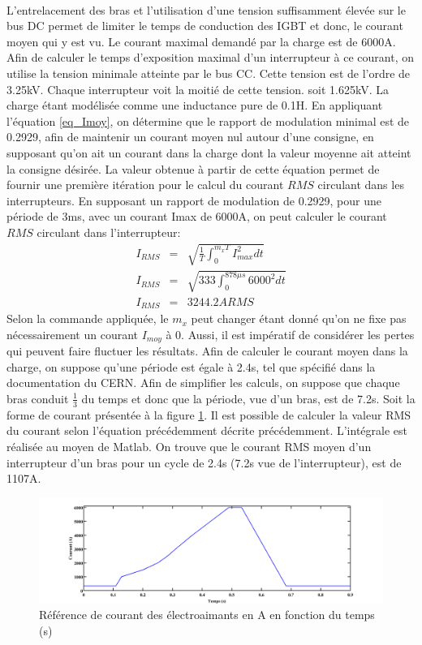 \paragraph{}L'entrelacement des bras et l'utilisation d'une tension suffisamment élevée sur le bus DC permet de limiter le temps de conduction des IGBT et donc, le courant moyen qui y est vu. Le courant maximal demandé par la charge est de 6000A. Afin de calculer le temps d'exposition maximal d'un interrupteur à ce courant, on utilise la tension minimale atteinte par le bus CC. Cette tension est de l'ordre de 3.25kV. Chaque interrupteur voit la moitié de cette tension. soit 1.625kV. La charge étant modélisée comme une inductance pure de 0.1H. En appliquant l'équation \ref{eq_Imoy}, on détermine que le rapport de modulation minimal est de 0.2929, afin de maintenir un courant moyen nul autour d'une consigne, en supposant qu'on ait un courant dans la charge dont la valeur moyenne ait atteint la consigne désirée. La valeur obtenue à partir de cette équation permet de fournir une première itération pour le calcul du courant $RMS$ circulant dans les interrupteurs. En supposant un rapport de modulation de 0.2929, pour une période de 3ms, avec un courant Imax de 6000A, on peut calculer le courant $RMS$ circulant dans l'interrupteur:
\begin{eqnarray}
I_{RMS} &=& \sqrt{\frac{1}{T}\int_0^{m_xT}I_{max}^2 dt}\\
I_{RMS} &=& \sqrt{333\int_0^{878\mu s}6000^2 dt}\\
I_{RMS} &=& 3244.2A RMS
\end{eqnarray}
Selon la commande appliquée, le $m_x$ peut changer étant donné qu'on ne fixe pas nécessairement un courant $I_{moy}$ à 0. Aussi, il est impératif de considérer les pertes qui peuvent faire fluctuer les résultats. Afin de calculer le courant moyen dans la charge, on suppose qu'une période est égale à 2.4s, tel que spécifié dans la documentation du CERN. Afin de simplifier les calculs, on suppose que chaque bras conduit $\frac{1}{3}$ du temps et donc que la période, vue d'un bras, est de 7.2s. Soit la forme de courant présentée à la figure \ref{fig_ref_courant}. Il est possible de calculer la valeur RMS du courant selon l'équation précédemment décrite précédemment. L'intégrale est réalisée au moyen de Matlab. On trouve que le courant RMS moyen d'un interrupteur d'un bras pour un cycle de 2.4s (7.2s vue de l'interrupteur), est de 1107A. 

\begin{figure}[htb]
\centering
\includegraphics[scale=0.4]{fig/fig_ref_courant.png}
\caption{Référence de courant des électroaimants en A en fonction du temps (s)}
\label{fig_ref_courant}
\end{figure}

